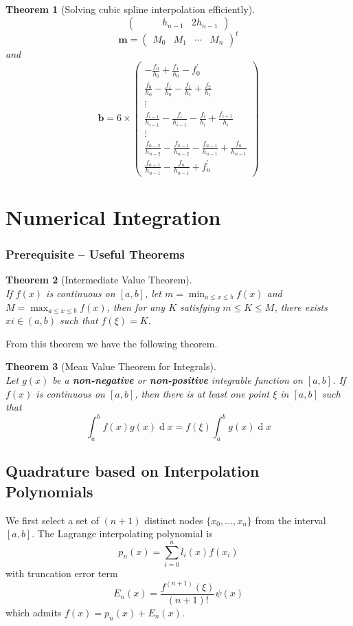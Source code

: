 \documentclass[12pt]{article}
\newtheorem{theorem}{Theorem}[section]
\theoremstyle{definition}
\DeclareMathOperator{\diff}{d}
\begin{document}
\begin{theorem}[Solving cubic spline interpolation efficiently]
\[\begin{pmatrix}
&&&h_{n-1}&2h_{n-1}\end{pmatrix}
\]
\[
\mathbf{m} = \begin{pmatrix} M_0&M_1&\cdots&M_{n}\end{pmatrix}^t
\]
and
\[
\mathbf{b} = 6\times\begin{pmatrix}
-\frac{f_0}{h_0}+\frac{f_1}{h_0}-f_0^\prime\\
\frac{f_0}{h_0}-\frac{f_1}{h_0}-\frac{f_1}{h_1}+\frac{f_2}{h_1}\\
\vdots\\
\frac{f_{i-1}}{h_{i-1}}-\frac{f_i}{h_{i-1}}-\frac{f_i}{h_i}+\frac{f_{i+1}}{h_i}\\
\vdots\\
\frac{f_{n-2}}{h_{n-2}}-\frac{f_{n-1}}{h_{n-2}}-\frac{f_{n-1}}{h_{n-1}}+\frac{f_n}{h_{n-1}}\\
\frac{f_{n-1}}{h_{n-1}}-\frac{f_n}{h_{n-1}}+f_n^\prime
\end{pmatrix}
\]
\end{theorem}
\clearpage
\section{Numerical Integration}
\subsubsection{Prerequisite -- Useful Theorems}
\begin{theorem}[Intermediate Value Theorem]
\hfill\\\normalfont 
If $f(x)$ is continuous on $[a,b]$, let $m=\displaystyle{\min_{a\leq x\leq b}f(x)}$ and $M=\displaystyle{\max_{a\leq x\leq b}f(x)}$, then for any $K$ satisfying $m\leq K\leq M$, there exists $xi\in(a,b)$ such that $f(\xi)=K$.
\end{theorem}
From this theorem we have the following theorem.
\begin{theorem}[Mean Value Theorem for Integrals]
\hfill\\\normalfont Let $g(x)$ be a \textbf{non-negative} or \textbf{non-positive} integrable function on $[a,b]$. If $f(x)$ is continuous on $[a,b]$, then there is at least one point $\xi$ in $[a,b]$ such that
\[
\int_a^b f(x)g(x)\diff x = f(\xi)\int_a^bg(x)\diff x
\]
\end{theorem}
\subsection{Quadrature based on Interpolation Polynomials}
We first select a set of $(n+1)$ distinct nodes $\{x_0,\ldots, x_n\}$ from the interval $[a,b]$. The Lagrange interpolating polynomial is
\[
p_n(x)=\sum_{i=0}^n l_i(x)f(x_i)
\]
with truncation error term
\[
E_n(x) = \frac{f^{(n+1)}(\xi)}{(n+1)!}\psi(x)
\]
which admits $f(x)=p_n(x)+E_n(x)$.
\end{document}
